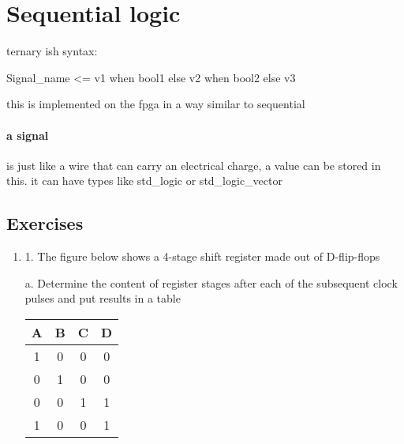 \section*{Sequential logic}
ternary ish syntax:

Signal\_name <= v1 when bool1 else v2 when bool2 else v3

this is implemented on the fpga in a way similar to sequential

\paragraph*{a signal} 
is just like a wire that can carry an electrical charge, a value can be stored in this. it can have types like std\_logic or std\_logic\_vector

\subsection*{Exercises}
\begin{enumerate}
    \item 1. The figure below shows a 4-stage shift register made out of D-flip-flops
    
    a. Determine the content of register stages after each of the subsequent clock pulses and put results in a table

    \begin{table}[H]
        \centering
        \begin{tabular}{|c|c|c|c|}
            \hline
            A & B & C & D \\\hline
            1 & 0 & 0 & 0 \\\hline
            0 & 1 & 0 & 0 \\\hline
            0 & 0 & 1 & 1 \\\hline
            1 & 0 & 0 & 1 \\\hline
        \end{tabular}
    \end{table}
\end{enumerate}